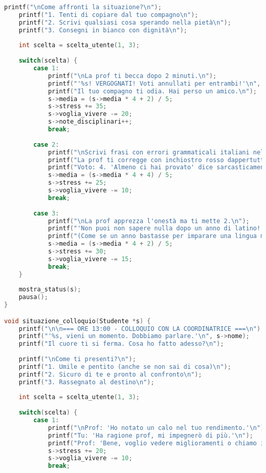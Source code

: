 \documentclass[a4paper,12pt]{article}
\begin{document}
\begin{lstlisting}[language=C, caption=Codice completo (file Capolavoro2.c)]
    printf("\nCome affronti la situazione?\n");
    printf("1. Tenti di copiare dal tuo compagno\n");
    printf("2. Scrivi qualsiasi cosa sperando nella pietà\n");
    printf("3. Consegni in bianco con dignità\n");
    
    int scelta = scelta_utente(1, 3);
    
    switch(scelta) {
        case 1:
            printf("\nLa prof ti becca dopo 2 minuti.\n");
            printf("'%s! VERGOGNATI! Voti annullati per entrambi!'\n", s->nome);
            printf("Il tuo compagno ti odia. Hai perso un amico.\n");
            s->media = (s->media * 4 + 2) / 5;
            s->stress += 35;
            s->voglia_vivere -= 20;
            s->note_disciplinari++;
            break;
            
        case 2:
            printf("\nScrivi frasi con errori grammaticali italiani nella versione latina.\n");
            printf("La prof ti corregge con inchiostro rosso dappertutto.\n");
            printf("Voto: 4. 'Almeno ci hai provato' dice sarcasticamente.\n");
            s->media = (s->media * 4 + 4) / 5;
            s->stress += 25;
            s->voglia_vivere -= 10;
            break;
            
        case 3:
            printf("\nLa prof apprezza l'onestà ma ti mette 2.\n");
            printf("'Non puoi non sapere nulla dopo un anno di latino!'\n");
            printf("(Come se un anno bastasse per imparare una lingua morta)\n");
            s->media = (s->media * 4 + 2) / 5;
            s->stress += 30;
            s->voglia_vivere -= 15;
            break;
    }
    
    mostra_status(s);
    pausa();
}

void situazione_colloquio(Studente *s) {
    printf("\n\n=== ORE 13:00 - COLLOQUIO CON LA COORDINATRICE ===\n");
    printf("'%s, vieni un momento. Dobbiamo parlare.'\n", s->nome);
    printf("Il cuore ti si ferma. Cosa ho fatto adesso?\n");
    
    printf("\nCome ti presenti?\n");
    printf("1. Umile e pentito (anche se non sai di cosa)\n");
    printf("2. Sicuro di te e pronto al confronto\n");
    printf("3. Rassegnato al destino\n");
    
    int scelta = scelta_utente(1, 3);
    
    switch(scelta) {
        case 1:
            printf("\nProf: 'Ho notato un calo nel tuo rendimento.'\n");
            printf("Tu: 'Ha ragione prof, mi impegnerò di più.'\n");
            printf("Prof: 'Bene, voglio vedere miglioramenti o chiamo i tuoi genitori.'\n");
            s->stress += 20;
            s->voglia_vivere -= 10;
            break;
            

\end{lstlisting}
\end{document}
